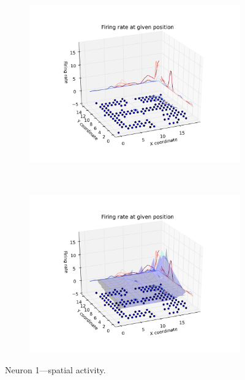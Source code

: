 \documentclass[11pt,a4paper,twocolumn]{article}
\begin{document}
\begin{figure}[h]
  \begin{subfigure}{.99\linewidth}\centering
    \includegraphics[width=1.1\textwidth]{figure6_a.png}
    \caption{\label{fig:3d_n1_a}}
  \end{subfigure}\\[1ex]
  \begin{subfigure}{.99\linewidth}\centering
    \includegraphics[width=1.1\textwidth]{figure6_b.png}
    \caption{\label{fig:3d_n1_b}}
  \end{subfigure}

  \caption{Neuron 1---spatial activity.\label{fig:3d_n1}}
\end{figure}
\end{document}
